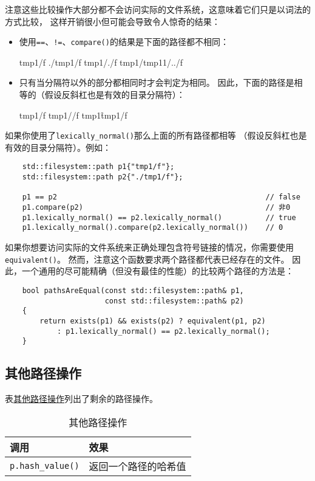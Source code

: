 注意这些比较操作大部分都不会访问实际的文件系统，这意味着它们只是以词法的方式比较，
这样开销很小但可能会导致令人惊奇的结果：
\begin{itemize}
    \item 使用\texttt{==}、\texttt{!=}、\texttt{compare()}的结果是下面的路径都不相同：
    \begin{blacklisting}
    tmp1/f
    ./tmp1/f
    tmp1/./f
    tmp1/tmp11/../f
    \end{blacklisting}
    \item 只有当分隔符以外的部分都相同时才会判定为相同。
    因此，下面的路径是相等的（假设反斜杠也是有效的目录分隔符）：
    \begin{blacklisting}
    tmp1/f
    tmp1//f
    tmp1\f
    tmp1/\/f
    \end{blacklisting}
\end{itemize}
如果你使用了\texttt{lexically\_normal()}那么上面的所有路径都相等
（假设反斜杠也是有效的目录分隔符）。例如：
\begin{lstlisting}
    std::filesystem::path p1{"tmp1/f"};
    std::filesystem::path p2{"./tmp1/f"};

    p1 == p2                                                // false
    p1.compare(p2)                                          // 非0
    p1.lexically_normal() == p2.lexically_normal()          // true
    p1.lexically_normal().compare(p2.lexically_normal())    // 0
\end{lstlisting}
如果你想要访问实际的文件系统来正确处理包含符号链接的情况，你需要使用\texttt{equivalent()}。
然而，注意这个函数要求两个路径都代表已经存在的文件。
因此，一个通用的尽可能精确（但没有最佳的性能）的比较两个路径的方法是：
\begin{lstlisting}
    bool pathsAreEqual(const std::filesystem::path& p1,
                       const std::filesystem::path& p2)
    {
        return exists(p1) && exists(p2) ? equivalent(p1, p2)
            : p1.lexically_normal() == p2.lexically_normal();
    }
\end{lstlisting}

\subsection{其他路径操作}
表\hyperref[t20.9]{其他路径操作}列出了剩余的路径操作。
\begin{table}[htb]
    \centering
    \begin{tabular}{l|l}
        \hline
        \textbf{调用}              & \textbf{效果} \\
        \hline
        \texttt{p.hash\_value()} & 返回一个路径的哈希值  \\
        \hline
    \end{tabular}
    \caption{其他路径操作}
    \label{t20.9}
\end{table}

